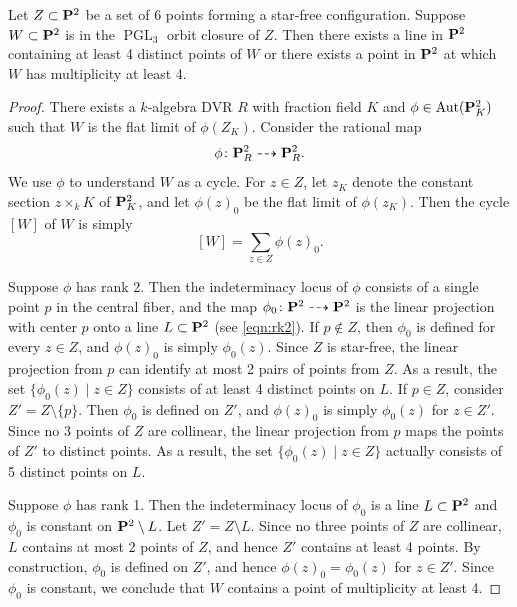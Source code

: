 \documentclass[reqno]{amsart}
\renewcommand{\k}{k}
\renewcommand {\P}{{\bf P}}
\providecommand{\PGL}{\operatorname{PGL}}
\providecommand{\Aut}{\operatorname{Aut}}
\numberwithin{equation}{section}
\begin{document}
\begin{proposition}\label{prop:limit4}
  Let $Z \subset \P^2$ be a set of 6 points forming a star-free configuration.
  Suppose $W \subset \P^2$ is in the $\PGL_3$ orbit closure of $Z$.
  Then there exists a line in $\P^2$ containing at least 4 distinct points of $W$ or there exists a point in $\P^2$ at which $W$ has multiplicity at least 4.
\end{proposition}
\begin{proof}
  There exists a $\k$-algebra DVR $R$ with fraction field $K$ and $\phi \in \Aut(\P^2_K)$ such that $W$ is the flat limit of $\phi(Z_K)$.
  Consider the rational map
  \[ \phi \colon \P^2_R \dashrightarrow \P^2_R.\]
  We use $\phi$ to understand $W$ as a cycle.
  For $z \in Z$, let $z_K$ denote the constant section $z \times_k K$ of $\P^2_K$, and let $\phi(z)_0$ be the flat limit of $\phi(z_K)$.
  Then the cycle $[W]$ of $W$ is simply
  \[ [W] = \sum_{z \in Z} \phi(z)_0.\]

  Suppose $\phi$ has rank 2.
  Then the indeterminacy locus of $\phi$ consists of a single point $p$ in the central fiber, and the map $\phi_0 \colon \P^2 \dashrightarrow \P^2$
  is the linear projection with center $p$ onto a line $L \subset \P^2$ (see \eqref{eqn:rk2}).
  If $p \not \in Z$, then  $\phi_0$ is defined for every $z \in Z$, and $\phi(z)_0$ is simply $\phi_0(z)$.
  Since $Z$ is star-free, the linear projection from $p$ can identify at most 2 pairs of points from $Z$.
  As a result, the set $\{\phi_0(z) \mid z \in Z\}$ consists of at least 4 distinct points on $L$.
  If $p \in Z$, consider $Z' = Z \setminus \{p\}$.
  Then $\phi_0$ is defined on $Z'$, and $\phi(z)_0$ is simply $\phi_0(z)$ for $z \in Z'$.
  Since no 3 points of $Z$ are collinear, the linear projection from $p$ maps the points of $Z'$ to distinct points.
  As a result, the set $\{\phi_0(z) \mid z \in Z\}$ actually consists of 5 distinct points on $L$.

  Suppose $\phi$ has rank 1.
  Then the indeterminacy locus of $\phi_0$ is a line $L \subset \P^2$ and $\phi_0$ is constant on $\P^2 \setminus L$.
  Let $Z' = Z \setminus L$.
  Since no three points of $Z$ are collinear, $L$ contains at most 2 points of $Z$, and hence $Z'$ contains at least 4 points.
  By construction, $\phi_0$ is defined on $Z'$, and hence $\phi(z)_0 = \phi_0(z)$ for $z \in Z'$.
  Since $\phi_0$ is constant, we conclude that $W$ contains a point of multiplicity at least 4.
\end{proof}
\end{document}
